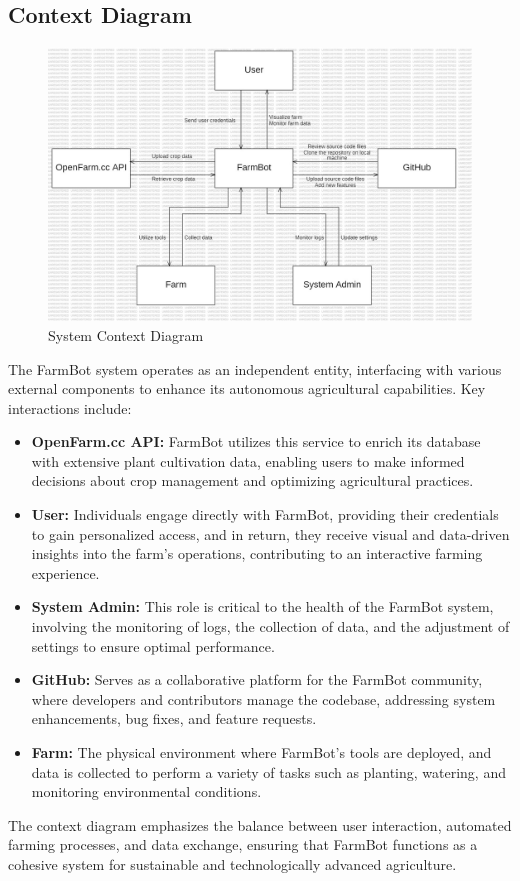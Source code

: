 \subsection{Context Diagram}
\begin{figure}[htbp]
    \centering
    \includegraphics[width=1\linewidth]{Figures/context_diagram.jpg}
    \caption{System Context Diagram}
    \label{ContextDiagram}
\end{figure}
\newpage
The FarmBot system operates as an independent entity, interfacing with various external components to enhance its autonomous agricultural capabilities. Key interactions include:
\begin{itemize}
    \item \textbf{OpenFarm.cc API:} FarmBot utilizes this service to enrich its database with extensive plant cultivation data, enabling users to make informed decisions about crop management and optimizing agricultural practices.
    \item \textbf{User:} Individuals engage directly with FarmBot, providing their credentials to gain personalized access, and in return, they receive visual and data-driven insights into the farm's operations, contributing to an interactive farming experience.
    \item \textbf{System Admin:} This role is critical to the health of the FarmBot system, involving the monitoring of logs, the collection of data, and the adjustment of settings to ensure optimal performance.
    \item \textbf{GitHub:} Serves as a collaborative platform for the FarmBot community, where developers and contributors manage the codebase, addressing system enhancements, bug fixes, and feature requests.
    \item \textbf{Farm:} The physical environment where FarmBot's tools are deployed, and data is collected to perform a variety of tasks such as planting, watering, and monitoring environmental conditions.
\end{itemize}
The context diagram emphasizes the balance between user interaction, automated farming processes, and data exchange, ensuring that FarmBot functions as a cohesive system for sustainable and technologically advanced agriculture.

